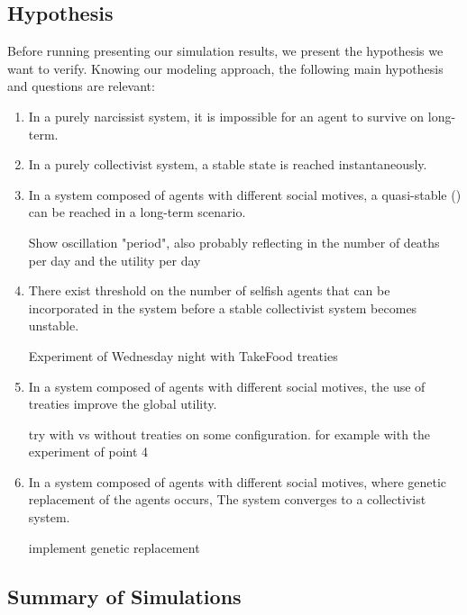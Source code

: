 \subsection{Hypothesis}\label{hypothesis}
Before running presenting our simulation results, we present the hypothesis we want to verify. Knowing our modeling approach, the following main hypothesis and questions are relevant:
\begin{enumerate}

    \item In a purely narcissist system, it is impossible for an agent to survive on long-term.
    
    \item In a purely collectivist system, a stable state is reached instantaneously.
    
    \item In a system composed of agents with different social motives, a quasi-stable () can be reached in  a long-term scenario.
    
        Show oscillation "period", also probably reflecting in the number of deaths per day and the utility per day
        
    \item There exist threshold on the number of selfish agents that can be incorporated in the system before a stable collectivist system becomes unstable.
     
     Experiment of Wednesday night with TakeFood treaties
     
    \item In a system composed of agents with different social motives, the use of treaties improve the global utility.
    
    try with vs without treaties on some configuration. for example with the experiment of point 4
    
    \item In a system composed of agents with different social motives, where genetic replacement of the agents occurs, The system converges to a collectivist system.
    
    implement genetic replacement
   
\end{enumerate}

\subsection{Summary of Simulations}\label{simulation_summary}

